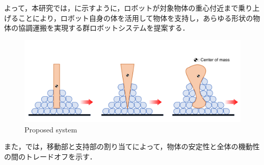 よって，本研究では，に示すように，ロボットが対象物体の重心付近まで乗り上げることにより，ロボット自身の体を活用して物体を支持し，あらゆる形状の物体の協調運搬を実現する群ロボットシステムを提案する．
\begin{figure}[tb]
  \centering
  \includegraphics[width=\columnwidth]{figure/proposed-system.pdf}
  \caption{Proposed system}
  \label{fig:proposed-system}
\end{figure}
また，では，移動部と支持部の割り当てによって，物体の安定性と全体の機動性の間のトレードオフを示す．
